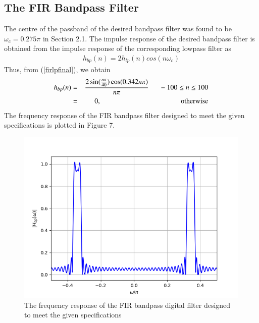 \documentclass{article}
\begin{document}
\subsection{The FIR Bandpass Filter}
The centre of the passband of the desired bandpass filter was found to be $\omega_c = 0.275\pi$ in Section
2.1.  The impulse response of the desired bandpass filter is obtained from the impulse response of the
corresponding lowpass filter as
\begin{eqnarray}
h_{bp}(n) = 2h_{lp}(n)cos(n\omega_c)
\end{eqnarray}
Thus, from (\ref{firlpfinal}), we obtain
\begin{eqnarray}
\label{firbpfinal}
h_{bp}(n) &=& \frac{2\sin(\frac{n\pi}{40}) \cos(0.342n\pi)}{n\pi} \indent -100 \leq n \leq 100 \nonumber \\
&=& 0, \hspace{4cm} \mbox{otherwise}
\end{eqnarray}
%
The frequency response of the FIR bandpass filter designed to meet the given specifications is plotted in Figure 7.
\begin{figure}[h!]
\label{fig6}
\includegraphics[width = 15cm]{figs/figure6.png}
\caption{The frequency response of the FIR bandpass digital filter designed to meet the given specifications} 
\end{figure}
\end{document}
